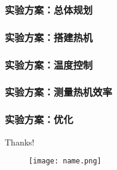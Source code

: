 \documentclass[aspectratio=169]{beamer}
\begin{document}
	
	\begin{frame}
		\frametitle{实验方案：总体规划}
	\end{frame}
	
	\begin{frame}
		\frametitle{实验方案：搭建热机}
	\end{frame}
	
	\begin{frame}
		\frametitle{实验方案：温度控制}
	\end{frame}
	
	\begin{frame}
		\frametitle{实验方案：测量热机效率}
	\end{frame}
	
	\begin{frame}
		\frametitle{实验方案：优化}
	\end{frame}
	
	
	
	\begin{frame}
		
		\begin{center}
			{\Huge\calligra Thanks!}
		\end{center}
		
		\begin{figure}[htbp]
			\centering
			\texttt{[image: name.png]}
		\end{figure}
		
	\end{frame}
	
	
	
	
	
	
	
\end{document}

